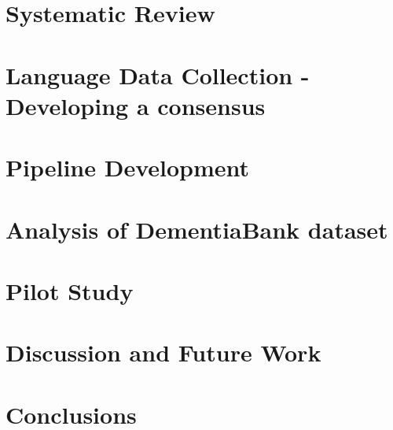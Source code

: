 \documentclass[twopages, a4paper]{book}
\begin{document}
\chapter{Systematic Review}

\chapter{Language Data Collection - Developing a consensus}

\chapter{Pipeline Development}

\chapter{Analysis of DementiaBank dataset}

\chapter{Pilot Study}

\chapter{Discussion and Future Work}

\chapter{Conclusions}



\end{document}
